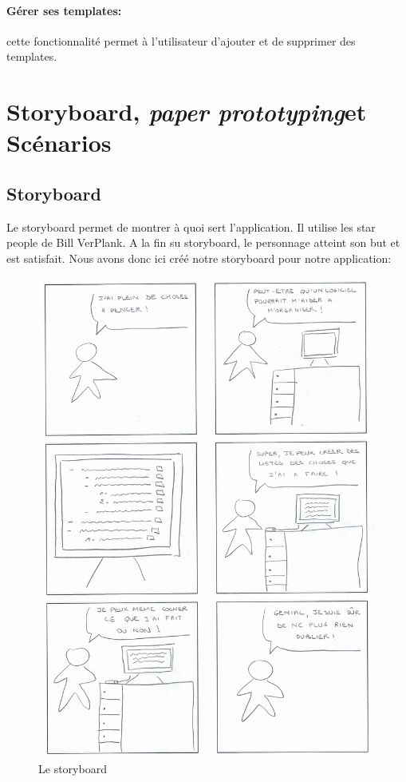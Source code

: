 \documentclass[a4paper,10pt]{article}
\newcommand{\paperPrototyping}{\emph{paper prototyping}}
\begin{document}
\paragraph{Gérer ses templates:} cette fonctionnalité permet à l'utilisateur d'ajouter et de supprimer des templates.

\newpage
\section{Storyboard, \paperPrototyping et Scénarios}

\subsection{Storyboard}
Le storyboard permet de montrer à quoi sert l'application. Il utilise les star people de Bill VerPlank. A la fin su storyboard, le personnage atteint son but et
est satisfait. Nous avons donc ici créé notre storyboard pour notre application:
\begin{figure}[H]
    \center
    \includegraphics[width=13.9cm]{Images/storyboard.png}
    \caption{Le storyboard}
\end{figure}
\end{document}
